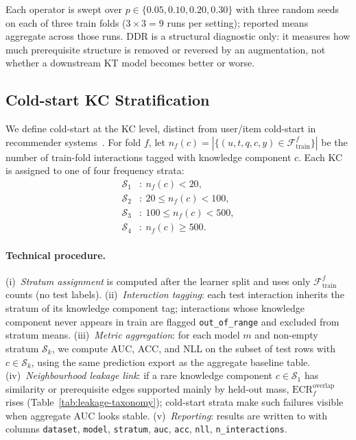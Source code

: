\documentclass[pdflatex,sn-basic]{sn-jnl}
\newcommand{\KC}{knowledge component}
\newcommand{\DDR}{\textsc{DDR}}
\begin{document}
Each operator is swept over $p\in\{0.05,0.10,0.20,0.30\}$ with three
random seeds on each of three train folds ($3\times 3=9$ runs per
setting); reported means aggregate across those runs. \DDR{} is a structural diagnostic only: it measures how
much prerequisite structure is removed or reversed by an augmentation,
not whether a downstream KT model becomes better or worse.
\subsection{Cold-start KC Stratification}
\label{sec:cold-start}
We define cold-start at the KC level, distinct from user/item
cold-start in recommender systems~\cite{schein2002coldstart}. For fold
$f$, let $n_f(c)=|\{(u,t,q,c,y)\in\mathcal{F}_{\text{train}}^f\}|$ be
the number of train-fold interactions tagged with \KC{} $c$. Each KC
is assigned to one of four frequency strata:
\[
\begin{aligned}
\mathcal{S}_1&:\ n_f(c)<20,\\
\mathcal{S}_2&:\ 20\le n_f(c)<100,\\
\mathcal{S}_3&:\ 100\le n_f(c)<500,\\
\mathcal{S}_4&:\ n_f(c)\ge 500.
\end{aligned}
\]
\paragraph{Technical procedure.}
(i)~\emph{Stratum assignment} is computed after the learner split and
uses only $\mathcal{F}_{\text{train}}^f$ counts (no test labels).
(ii)~\emph{Interaction tagging}: each test interaction inherits the
stratum of its \KC{} tag; interactions whose \KC{} never appears in train
are flagged \texttt{out\_of\_range} and excluded from stratum means.
(iii)~\emph{Metric aggregation}: for each model $m$ and non-empty stratum
$\mathcal{S}_k$, we compute AUC, ACC, and NLL on the subset of test
rows with $c\in\mathcal{S}_k$, using the same prediction export as the
aggregate baseline table.
(iv)~\emph{Neighbourhood leakage link}: if a rare \KC{} $c\in\mathcal{S}_1$
has similarity or prerequisite edges supported mainly by held-out mass,
$\mathrm{ECR}^{\mathrm{overlap}}_f$ rises (Table~\ref{tab:leakage-taxonomy});
cold-start strata make such failures visible when aggregate AUC looks stable.
(v)~\emph{Reporting}: results are written to
 with columns
\texttt{dataset}, \texttt{model}, \texttt{stratum}, \texttt{auc},
\texttt{acc}, \texttt{nll}, \texttt{n\_interactions}.
\end{document}
